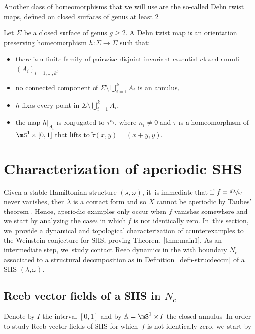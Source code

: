 Another class of homeomorphisms that we will use are the so-called Dehn twist maps, defined on closed surfaces of genus at least $2$.
\begin{defi}
Let $\Sigma$ be a closed surface of genus $g\geq 2$. A Dehn twist map is an orientation preserving homeomorphism $h:\Sigma \to \Sigma$ such that:
\begin{itemize}
\item
there is a finite family of pairwise disjoint invariant essential closed annuli $(A_i)_{i=1,\dots,k}$,
\item
no connected component of $\Sigma\setminus \bigcup_{i=1}^k A_i$ is an annulus,
\item
$h$ fixes every point in $\Sigma \setminus \bigcup_{i=1}^k A_i$,
\item
the map $h|_{A_i}$ is conjugated to $\tau^{n_i}$, where $n_i\neq 0$ and $\tau$ is a homeomorphism of $\mS^1\times [0,1]$ that lifts to $\widetilde \tau (x,y)=(x+y,y)$.
\end{itemize}
\end{defi}

\section{Characterization of aperiodic SHS}\label{s:Aper}

Given a stable Hamiltonian structure $(\lambda,\omega)$, it~is immediate that if $f=\sfrac{d\lambda}{\omega}$ never vanishes, then $\lambda$ is a contact form and so $X$ cannot be aperiodic by Taubes' theorem \cite{Taub}. Hence, aperiodic examples only occur when $f$ vanishes somewhere and we start by analyzing the cases in which $f$ is not identically zero. In~this section, we~provide a dynamical and topological characterization of counterexamples to the Weinstein conjecture for SHS, proving Theorem~\ref{thm:main1}. As an intermediate step, we~study contact Reeb dynamics in the \threemanifold with boundary $N_c$ associated to a structural decomposition as in Definition~\ref{defn-strucdecom} of a SHS $(\lambda,\omega)$.

\subsection{Reeb vector fields of a SHS in $N_c$}

Denote by $I$ the interval $[0,1]$ and by $\mathbb{A}=\mS^1\times I$ the closed annulus.
In order to study Reeb vector fields of SHS for which~$f$ is not identically zero, we~start by

